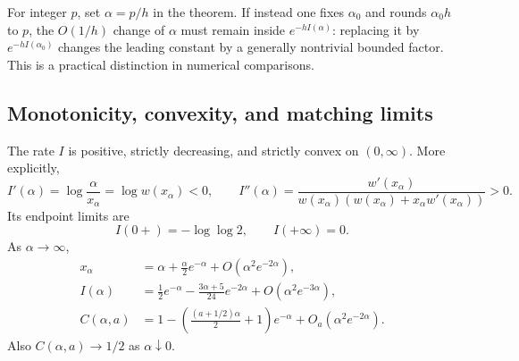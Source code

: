 \begin{remark}
For integer $p$, set $\alpha=p/h$ in the theorem. If instead one fixes
$\alpha_0$ and rounds $\alpha_0h$ to $p$, the $O(1/h)$ change of
$\alpha$ must remain inside $e^{-hI(\alpha)}$: replacing it by
$e^{-hI(\alpha_0)}$ changes the leading constant by a generally
nontrivial bounded factor. This is a practical distinction in numerical
comparisons.
\end{remark}

\subsection{Monotonicity, convexity, and matching limits}

\begin{proposition}\label{saddle:prop:rate-properties}
The rate $I$ is positive, strictly decreasing, and strictly convex on
$(0,\infty)$. More explicitly,
\begin{equation}\label{saddle:eq:rate-derivatives}
 I'(\alpha)=\log\frac{\alpha}{x_\alpha}=\log w(x_\alpha)<0,
 \qquad
 I''(\alpha)=\frac{w'(x_\alpha)}
 {w(x_\alpha)(w(x_\alpha)+x_\alpha w'(x_\alpha))}>0.
\end{equation}
Its endpoint limits are
\[
 I(0+)=-\log\log2,\qquad I(+\infty)=0.
\]
As $\alpha\to\infty$,
\begin{align}
 x_\alpha&=\alpha+\frac{\alpha}{2}e^{-\alpha}
             +O(\alpha^2e^{-2\alpha}),\label{saddle:eq:x-large}\\
 I(\alpha)&=\frac12e^{-\alpha}
      -\frac{3\alpha+5}{24}e^{-2\alpha}
      +O(\alpha^2e^{-3\alpha}),\label{saddle:eq:I-large}\\
 C(\alpha,a)&=1-
 \left(\frac{(a+1/2)\alpha}{2}+1\right)e^{-\alpha}
 +O_a(\alpha^2e^{-2\alpha}).\label{saddle:eq:C-large}
\end{align}
Also $C(\alpha,a)\to1/2$ as $\alpha\downarrow0$.
\end{proposition}
